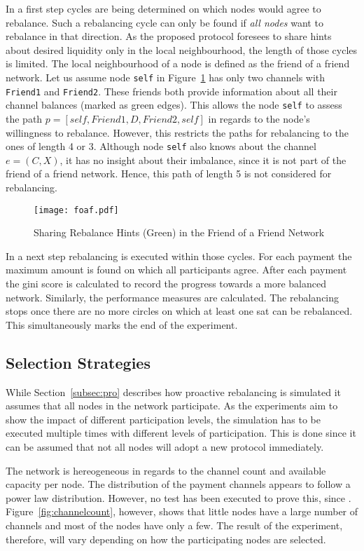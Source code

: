 \documentclass[final]{fhnwreport}       %
\begin{document}
In a first step cycles are being determined on which nodes would agree to rebalance. Such a rebalancing cycle can only be found if \emph{all nodes} want to rebalance in that direction. As the proposed protocol foresees to share hints about desired liquidity only in the local neighbourhood, the length of those cycles is limited. The local neighbourhood of a node is defined as the friend of a friend network. Let us assume node \texttt{self} in Figure~\ref{fig:foaf} has only two channels with \texttt{Friend1} and \texttt{Friend2}. These friends both provide information about all their channel balances (marked as green edges). This allows the node \texttt{self} to assess the path $p = [self, Friend1, D, Friend2, self]$ in regards to the node's willingness to rebalance. However, this restricts the paths for rebalancing to the ones of length 4 or 3. Although node \texttt{self} also knows about the channel $e = (C, X)$, it has no insight about their imbalance, since it is not part of the friend of a friend network. Hence, this path of length 5 is not considered for rebalancing.

\begin{figure}[H]
\centering
\texttt{[image: foaf.pdf]}
\caption{Sharing Rebalance Hints (Green) in the Friend of a Friend Network}
\label{fig:foaf}
\end{figure}

In a next step rebalancing is executed within those cycles. For each payment the maximum amount is found on which all participants agree. After each payment the \gls{gini} score is calculated to record the progress towards a more balanced network. Similarly, the performance measures are calculated. The rebalancing stops once there are no more circles on which at least one sat can be rebalanced. This simultaneously marks the end of the experiment.


\subsection{Selection Strategies}\label{subsec:selstrat}
While Section~\ref{subsec:pro} describes how proactive rebalancing is simulated it assumes that all nodes in the network participate. As the experiments aim to show the impact of different participation levels, the simulation has to be executed multiple times with different levels of participation. This is done since it can be assumed that not all nodes will adopt a new protocol immediately.

The network is hereogeneous in regards to the channel count and available capacity per node. The distribution of the payment channels appears to follow a power law distribution. However, no test has been executed to prove this, since . Figure~\ref{fig:channelcount}, however, shows that little nodes have a large number of channels and most of the nodes have only a few. The result of the experiment, therefore, will vary depending on how the participating nodes are selected. 
\end{document}

